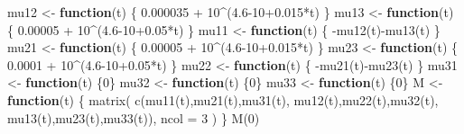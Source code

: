 \documentclass[a4paper,10pt,openany]{book}
\newenvironment{Shaded}{\begin{snugshade}}{\end{snugshade}}
\newcommand{\AttributeTok}[1]{\textcolor[rgb]{0.77,0.63,0.00}{#1}}
\newcommand{\ControlFlowTok}[1]{\textcolor[rgb]{0.13,0.29,0.53}{\textbf{#1}}}
\newcommand{\DecValTok}[1]{\textcolor[rgb]{0.00,0.00,0.81}{#1}}
\newcommand{\FloatTok}[1]{\textcolor[rgb]{0.00,0.00,0.81}{#1}}
\newcommand{\FunctionTok}[1]{\textcolor[rgb]{0.00,0.00,0.00}{#1}}
\newcommand{\NormalTok}[1]{#1}
\newcommand{\OtherTok}[1]{\textcolor[rgb]{0.56,0.35,0.01}{#1}}
\newcommand{\SpecialCharTok}[1]{\textcolor[rgb]{0.00,0.00,0.00}{#1}}
\begin{document}
\begin{Shaded}
\begin{Highlighting}[]
\NormalTok{mu12 }\OtherTok{\textless{}{-}} \ControlFlowTok{function}\NormalTok{(t) \{}
  \FloatTok{0.000035} \SpecialCharTok{+} \DecValTok{10}\SpecialCharTok{\^{}}\NormalTok{(}\FloatTok{4.6}\DecValTok{{-}10}\FloatTok{+0.015}\SpecialCharTok{*}\NormalTok{t)}
\NormalTok{\}}
\NormalTok{mu13 }\OtherTok{\textless{}{-}} \ControlFlowTok{function}\NormalTok{(t) \{}
  \FloatTok{0.00005} \SpecialCharTok{+} \DecValTok{10}\SpecialCharTok{\^{}}\NormalTok{(}\FloatTok{4.6}\DecValTok{{-}10}\FloatTok{+0.05}\SpecialCharTok{*}\NormalTok{t)}
\NormalTok{\}}
\NormalTok{mu11 }\OtherTok{\textless{}{-}} \ControlFlowTok{function}\NormalTok{(t) \{}
  \SpecialCharTok{{-}}\FunctionTok{mu12}\NormalTok{(t)}\SpecialCharTok{{-}}\FunctionTok{mu13}\NormalTok{(t)}
\NormalTok{\}}
\NormalTok{mu21 }\OtherTok{\textless{}{-}} \ControlFlowTok{function}\NormalTok{(t) \{}
  \FloatTok{0.00005} \SpecialCharTok{+} \DecValTok{10}\SpecialCharTok{\^{}}\NormalTok{(}\FloatTok{4.6}\DecValTok{{-}10}\FloatTok{+0.015}\SpecialCharTok{*}\NormalTok{t)}
\NormalTok{\}}
\NormalTok{mu23 }\OtherTok{\textless{}{-}} \ControlFlowTok{function}\NormalTok{(t) \{}
  \FloatTok{0.0001} \SpecialCharTok{+} \DecValTok{10}\SpecialCharTok{\^{}}\NormalTok{(}\FloatTok{4.6}\DecValTok{{-}10}\FloatTok{+0.05}\SpecialCharTok{*}\NormalTok{t)}
\NormalTok{\}}
\NormalTok{mu22 }\OtherTok{\textless{}{-}} \ControlFlowTok{function}\NormalTok{(t) \{}
  \SpecialCharTok{{-}}\FunctionTok{mu21}\NormalTok{(t)}\SpecialCharTok{{-}}\FunctionTok{mu23}\NormalTok{(t)}
\NormalTok{\}}
\NormalTok{mu31 }\OtherTok{\textless{}{-}} \ControlFlowTok{function}\NormalTok{(t) \{}\DecValTok{0}\NormalTok{\}}
\NormalTok{mu32 }\OtherTok{\textless{}{-}} \ControlFlowTok{function}\NormalTok{(t) \{}\DecValTok{0}\NormalTok{\}}
\NormalTok{mu33 }\OtherTok{\textless{}{-}} \ControlFlowTok{function}\NormalTok{(t) \{}\DecValTok{0}\NormalTok{\}}
\NormalTok{M }\OtherTok{\textless{}{-}} \ControlFlowTok{function}\NormalTok{(t) \{}
  \FunctionTok{matrix}\NormalTok{(}
    \FunctionTok{c}\NormalTok{(}\FunctionTok{mu11}\NormalTok{(t),}\FunctionTok{mu21}\NormalTok{(t),}\FunctionTok{mu31}\NormalTok{(t),}
      \FunctionTok{mu12}\NormalTok{(t),}\FunctionTok{mu22}\NormalTok{(t),}\FunctionTok{mu32}\NormalTok{(t),}
      \FunctionTok{mu13}\NormalTok{(t),}\FunctionTok{mu23}\NormalTok{(t),}\FunctionTok{mu33}\NormalTok{(t)),}
    \AttributeTok{ncol =} \DecValTok{3}
\NormalTok{  )}
\NormalTok{\}}
\FunctionTok{M}\NormalTok{(}\DecValTok{0}\NormalTok{)}
\end{Highlighting}
\end{Shaded}
\end{document}

